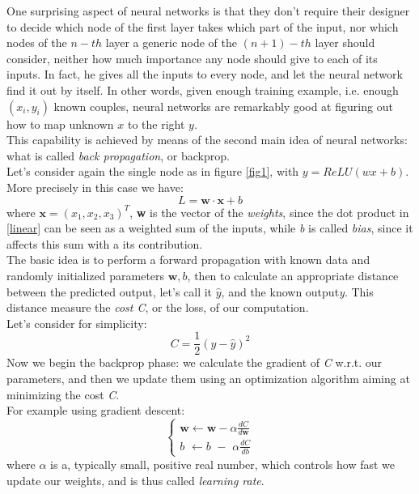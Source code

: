 \documentclass[12pt, a4paper]{report}
\theoremstyle{definition}
\begin{document}
\newline \noindent One surprising aspect of neural networks is that they don't require their designer to decide which node of the first layer takes which part of the input, nor which nodes of the $n\!-\!th$ layer a generic node of the $(n+1)\!-\!th$ layer should consider, neither how much importance any node should give to each of its inputs. In fact, he gives all the inputs to every node, and let the neural network find it out by itself. In other words, given enough training example, i.e. enough $(x_i,y_i)$ known couples, neural networks are remarkably good at figuring out how to map unknown $x$ to the right $y$.\\
This capability is achieved by means of the second main idea of neural networks: what is called \textit{back propagation}, or backprop.\\
Let's consider again the single node as in figure \ref{fig1}, with $y=ReLU(wx+b)$. More precisely in this case we have:
\begin{equation}\label{linear}
L=\mathbf{w \cdot x} + b
\end{equation}
where $\mathbf x = (x_1,x_2,x_3)^T$, \textbf{w} is the vector of the \textit{weights}, since the dot product in \eqref{linear} can be seen as a weighted sum of the inputs, while \textit{b} is called \textit{bias}, since it affects this sum with a its contribution. \\
The basic idea is to perform a forward propagation with known data and randomly initialized parameters $\mathbf w,b$, then to calculate an appropriate distance between the predicted output, let's call it $\hat y$, and the known output\textit{y}.
This distance measure the \textit{cost C}, or the loss, of our computation.\\
Let's consider for simplicity:
\[
C=\frac{1}{2}(y-\hat y)^2
\]
Now we begin the backprop phase: we calculate the gradient of \textit{C} w.r.t. our parameters, and then we update them using an optimization algorithm aiming at minimizing the cost \textit{C}.\\
For example using gradient descent:
\begin{equation}\label{grad_desc}
\begin{cases}
\mathbf w \leftarrow \mathbf w - \alpha \frac{dC}{d\mathbf w} \\
b \,\,\leftarrow b\,\, - \,\,\alpha \frac{dC}{db}
\end{cases}
\end{equation}
where $\alpha$ is a, typically small, positive real number, which controls how fast we update our weights, and is thus called \textit{learning rate}.\\
\end{document}
